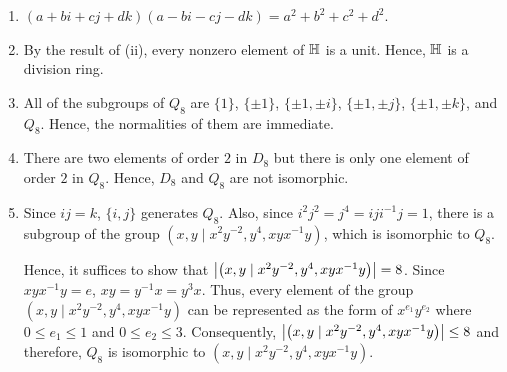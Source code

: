 {\begin{enumerate}[label=(\roman*)]
        \item
            $(a+bi+cj+dk)(a-bi-cj-dk) = a^2+b^2+c^2+d^2$.

        \item
            By the result of (ii), every nonzero element of $\mathbb{H}$ is a unit.
            Hence, $\mathbb{H}$ is a division ring.
        \clearpage
        
        \item
            All of the subgroups of $Q_8$ are $\{1\}$, $\{\pm1\}$, $\{\pm1,\pm i\}$, $\{\pm1,\pm j\}$, $\{\pm1,\pm k\}$, and $Q_8$.
            Hence, the normalities of them are immediate.

        \item
            There are two elements of order $2$ in $D_8$ but there is only one element of order $2$ in $Q_8$.
            Hence, $D_8$ and $Q_8$ are not isomorphic.

        \item
            Since $ij = k$, $\{ i,j \}$ generates $Q_8$.
            Also, since $i^2j^2 = j^4 = iji^{-1}j = 1$, there is a subgroup of the group $\left( x,y \mid x^2y^{-2}, y^4, xyx^{-1}y \right)$, which is isomorphic to $Q_8$.

            Hence, it suffices to show that $\left\lvert \left( x,y \mid x^2y^{-2}, y^4, xyx^{-1}y \right) \right\rvert = 8$.
            Since $xyx^{-1}y = e$, $xy = y^{-1}x = y^3x$.
            Thus, every element of the group $\left( x,y \mid x^2y^{-2}, y^4, xyx^{-1}y \right)$ can be represented as the form of $x^{e_1}y^{e_2}$ where $0 \leq e_1 \leq 1$ and $0 \leq e_2 \leq 3$.
            Consequently, $\left\lvert \left( x,y \mid x^2y^{-2}, y^4, xyx^{-1}y \right) \right\rvert \leq 8$ and therefore, $Q_8$ is isomorphic to $\left( x,y \mid x^2y^{-2}, y^4, xyx^{-1}y \right)$.
    \end{enumerate}
}

